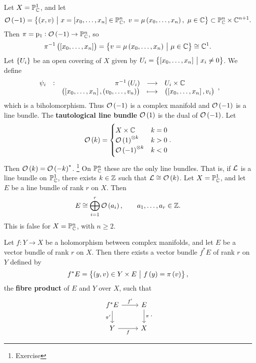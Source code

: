\begin{example}
Let $ X = \mathbb{P}_{\mathbb{C}}^1 $, and let
$$ \OOO\br{-1} = \cbr{\br{x, v} \st x = \sbr{x_0, \dots, x_n} \in \PP_\CC^n, \ v = \mu\br{x_0, \dots, x_n}, \ \mu \in \CC} \subset \PP_\CC^n \times \CC^{n + 1}. $$
Then $ \pi = \p_1 : \OOO\br{-1} \to \PP_\CC^n $, so
$$ \pi^{-1}\br{\sbr{x_0, \dots, x_n}} = \cbr{v = \mu\br{x_0, \dots, x_n} \st \mu \in \CC} \cong \CC^1. $$
Let $ \cbr{U_i} $ be an open covering of $ X $ given by $ U_i = \cbr{\sbr{x_0, \dots, x_n} \st x_i \ne 0} $. We define
$$ \function[\psi_i]{\pi^{-1}\br{U_i}}{U_i \times \CC}{\br{\sbr{x_0, \dots, x_n}, \br{v_0, \dots, v_n}}}{\br{\sbr{x_0, \dots, x_n}, v_i}}, $$
which is a biholomorphism. Thus $ \OOO\br{-1} $ is a complex manifold and $ \OOO\br{-1} $ is a line bundle. The \textbf{tautological line bundle} $ \OOO\br{1} $ is the dual of $ \OOO\br{-1} $. Let
$$ \OOO\br{k} =
\begin{cases}
X \times \CC & k = 0 \\
\OOO\br{1}^{\otimes k} & k > 0 \\
\OOO\br{-1}^{\otimes k} & k < 0
\end{cases}.
$$
Then $ \OOO\br{k} = \OOO\br{-k}^* $. \footnote{Exercise} On $ \mathbb{P}_{\mathbb{C}}^n $ these are the only line bundles. That is, if $ \mathcal{L} $ is a line bundle on $ \mathbb{P}_{\mathbb{C}}^1 $, there exists $ k \in \mathbb{Z} $ such that $ \LLL \cong \OOO\br{k} $. Let $ X = \mathbb{P}_{\mathbb{C}}^1 $, and let $ E $ be a line bundle of rank $ r $ on $ X $. Then
$$ E \cong \bigoplus_{i = 1}^r \OOO\br{a_i}, \qquad a_1, \dots, a_r \in \ZZ. $$
This is false for $ X = \mathbb{P}_{\mathbb{C}}^n $, with $ n \ge 2 $.
\end{example}

\pagebreak

\begin{definition}
Let $ f : Y \to X $ be a holomorphism between complex manifolds, and let $ E $ be a vector bundle of rank $ r $ on $ X $. Then there exists a vector bundle $ f^*E $ of rank $ r $ on $ Y $ defined by
$$ f^*E = \cbr{\br{y, v} \in Y \times E \st f\br{y} = \pi\br{v}}, $$
the \textbf{fibre product} of $ E $ and $ Y $ over $ X $, such that
$$
\begin{tikzcd}
f^*E \arrow{r}{f'} \arrow[swap]{d}{\pi'} & E \arrow{d}{\pi} \\
Y \arrow[swap]{r}{f} & X
\end{tikzcd}.
$$
\end{definition}

